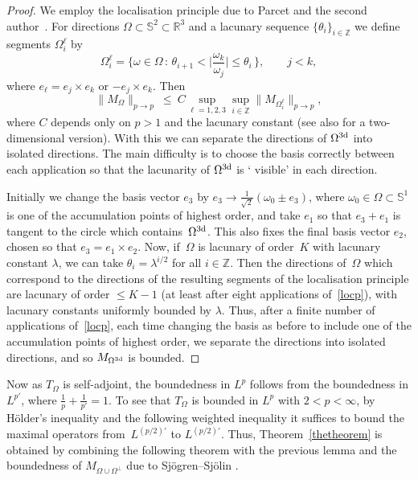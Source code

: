 \documentclass[11pt]{amsart}
\theoremstyle{definition}
\theoremstyle{remark}
\begin{document}
\begin{proof} We employ the localisation principle due to Parcet and the second author~\cite{PR}.
For directions $\Omega\subset \mathbb{S}^2\subset \mathbb{R}^3$ and a lacunary sequence $\{\theta_i\}_{i\in\mathbb{Z}}$ we define segments $\Omega_{i}^\ell$ by
$$
\Omega_{i}^\ell=\Big\{ \omega \in \Omega\, :\, \theta_{i+1}<
\Big|\frac{\omega_k}{\omega_j}\Big|{\leqslant} \theta_i\,\Big\},\qquad j<k,
$$
where $e_\ell=e_j\times e_k$ or $-e_j\times e_k$. Then
\begin{equation}\label{locp}
\|M_\Omega\|_{p\to p}\ {\leqslant} \ C \sup_{\ell=1,2,3}\sup_{i\in\mathbb{Z}}\|M_{\Omega_{i}^\ell}\|_{p\to p},
\end{equation}
where $C$ depends only on $p>1$ and the lacunary constant (see also \cite{A} for a two-dimensional version). With this we can separate
the directions of $\Omega^{\rm 3d}$ into isolated directions. The
main difficulty is to choose the basis correctly between each
application so that the lacunarity of $\Omega^{\rm 3d}$ is \lq
visible' in each direction.

Initially we change the basis vector $e_3$ by $e_3\to
\tfrac{1}{\sqrt{2}}(\omega_{0}\pm e_3)$, where
$\omega_{0}\in\Omega\subset \mathbb{S}^1$ is one of the accumulation
points  of highest order, and take $e_1$ so that $e_3+e_1$ is
tangent to the circle which contains~$\Omega^{\rm 3d}$.
 This also fixes the final basis vector $e_2$, chosen so that $e_3=e_1\times e_2$.
 Now, if~$\Omega$ is lacunary of order~$K$ with lacunary constant ${\lambda}$,
 we can take $\theta_i={\lambda}^{i/2}$ for all $i\in\mathbb{Z}$. Then the directions of~$\Omega$ which
 correspond to the
 directions of the resulting segments
  of the localisation principle are lacunary of order ${\leqslant} K-1$ (at
 least after eight applications of~\eqref{locp}), with lacunary constants uniformly bounded by ${\lambda}$. Thus,
  after a finite number of applications of~\eqref{locp}, each time changing the basis as before to include one of the accumulation points of highest order, we separate the directions into isolated directions, and so  $M_{\Omega^{\rm 3d}}$ is bounded.
\end{proof}

Now as $T_{\Omega}$ is self-adjoint, the boundedness in $L^p$ follows from the boundedness in $L^{p'}$, where $\frac{1}{p}+\frac{1}{p'}=1$. To see that $T_{\Omega}$ is bounded in $L^p$ with $2< p<\infty$, by H\"older's inequality and the following weighted inequality it suffices to bound the maximal operators from~$L^{(p/2)'}$ to $L^{(p/2)'}$. Thus, Theorem~\ref{thetheorem} is obtained by combining the following theorem with the previous lemma and the boundedness of $M_{\Omega\cup\Omega^\perp}$ due to Sj\"ogren--Sj\"olin \cite{SS}.
\end{document}

